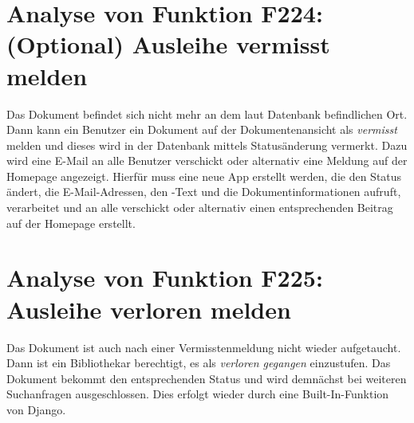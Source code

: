 \section{Analyse von Funktion F224: (Optional) Ausleihe vermisst melden}
Das Dokument befindet sich nicht mehr an dem laut Datenbank befindlichen Ort. Dann kann ein Benutzer ein Dokument auf der Dokumentenansicht als \emph{vermisst} melden und dieses wird in der Datenbank mittels Statusänderung vermerkt. Dazu wird eine E-Mail an alle Benutzer verschickt oder alternativ eine Meldung auf der Homepage angezeigt. Hierfür muss eine neue App erstellt werden, die den Status ändert, die E-Mail-Adressen, den -Text und die Dokumentinformationen aufruft, verarbeitet und an alle verschickt oder alternativ einen entsprechenden Beitrag auf der Homepage erstellt.

\section{Analyse von Funktion F225: Ausleihe verloren melden}
Das Dokument ist auch nach einer Vermisstenmeldung nicht wieder aufgetaucht. Dann ist ein Bibliothekar berechtigt, es als \emph{verloren gegangen} einzustufen. Das Dokument bekommt den entsprechenden Status und wird demnächst bei weiteren Suchanfragen ausgeschlossen. Dies erfolgt wieder durch eine Built-In-Funktion von Django.